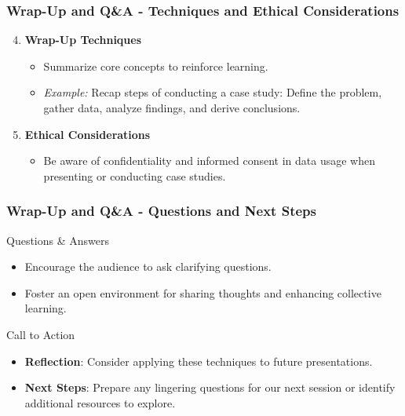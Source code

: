 \documentclass[aspectratio=169]{beamer}
\begin{document}
\begin{frame}[fragile]
    \frametitle{Wrap-Up and Q\&A - Techniques and Ethical Considerations}
    \begin{enumerate}
        \setcounter{enumi}{3}
        \item \textbf{Wrap-Up Techniques}
            \begin{itemize}
                \item Summarize core concepts to reinforce learning.
                \item \textit{Example:} Recap steps of conducting a case study: Define the problem, gather data, analyze findings, and derive conclusions.
            \end{itemize}

        \item \textbf{Ethical Considerations}
            \begin{itemize}
                \item Be aware of confidentiality and informed consent in data usage when presenting or conducting case studies.
            \end{itemize}
    \end{enumerate}
\end{frame}

\begin{frame}[fragile]
    \frametitle{Wrap-Up and Q\&A - Questions and Next Steps}
    \begin{block}{Questions \& Answers}
        \begin{itemize}
            \item Encourage the audience to ask clarifying questions.
            \item Foster an open environment for sharing thoughts and enhancing collective learning.
        \end{itemize}
    \end{block}

    \begin{block}{Call to Action}
        \begin{itemize}
            \item \textbf{Reflection}: Consider applying these techniques to future presentations.
            \item \textbf{Next Steps}: Prepare any lingering questions for our next session or identify additional resources to explore.
        \end{itemize}
    \end{block}
\end{frame}
\end{document}
